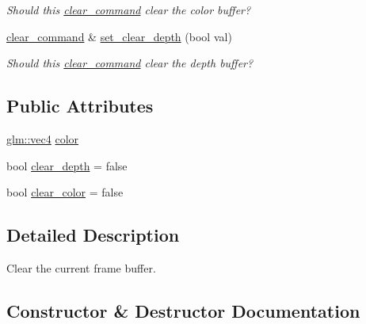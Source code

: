 \begin{DoxyCompactItemize}
\begin{DoxyCompactList}\small\item\em Should this \mbox{\hyperlink{classmoka_1_1clear__command}{clear\+\_\+command}} clear the color buffer? \end{DoxyCompactList}\item 
\mbox{\hyperlink{classmoka_1_1clear__command}{clear\+\_\+command}} \& \mbox{\hyperlink{classmoka_1_1clear__command_a6d6b5e04ad90cd6117900a8cc78d6a33}{set\+\_\+clear\+\_\+depth}} (bool val)
\begin{DoxyCompactList}\small\item\em Should this \mbox{\hyperlink{classmoka_1_1clear__command}{clear\+\_\+command}} clear the depth buffer? \end{DoxyCompactList}\end{DoxyCompactItemize}
\subsection*{Public Attributes}
\begin{DoxyCompactItemize}
\item 
\mbox{\hyperlink{namespacemoka_aed2224bc0e5b79e57a8975ded94ee1aaa1a9028fd802c481a99491a418ca2fe86}{glm\+::vec4}} \mbox{\hyperlink{classmoka_1_1clear__command_a867d78366e722acd2305ee78181b2748}{color}}
\item 
bool \mbox{\hyperlink{classmoka_1_1clear__command_abd51ab75be7795fe788558f30553b356}{clear\+\_\+depth}} = false
\item 
bool \mbox{\hyperlink{classmoka_1_1clear__command_acacddddcbe3c124fbd9655b0377cc4eb}{clear\+\_\+color}} = false
\end{DoxyCompactItemize}


\subsection{Detailed Description}
Clear the current frame buffer. 

\subsection{Constructor \& Destructor Documentation}
\mbox{\label{classmoka_1_1clear__command_a08e1abf9988fdabf7e9f85705614fbd4}} 
